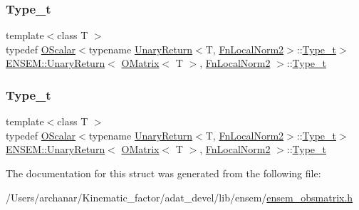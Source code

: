 \subsubsection{\texorpdfstring{Type\_t}{Type\_t}\hspace{0.1cm}{\footnotesize\ttfamily [1/2]}}
{\footnotesize\ttfamily template$<$class T $>$ \\
typedef \mbox{\hyperlink{classENSEM_1_1OScalar}{O\+Scalar}}$<$typename \mbox{\hyperlink{structENSEM_1_1UnaryReturn}{Unary\+Return}}$<$T, \mbox{\hyperlink{structENSEM_1_1FnLocalNorm2}{Fn\+Local\+Norm2}}$>$\+::\mbox{\hyperlink{structENSEM_1_1UnaryReturn_3_01OMatrix_3_01T_01_4_00_01FnLocalNorm2_01_4_a9961e369c46fba05c0388f2ac5bef1ca}{Type\+\_\+t}}$>$ \mbox{\hyperlink{structENSEM_1_1UnaryReturn}{E\+N\+S\+E\+M\+::\+Unary\+Return}}$<$ \mbox{\hyperlink{classENSEM_1_1OMatrix}{O\+Matrix}}$<$ T $>$, \mbox{\hyperlink{structENSEM_1_1FnLocalNorm2}{Fn\+Local\+Norm2}} $>$\+::\mbox{\hyperlink{structENSEM_1_1UnaryReturn_3_01OMatrix_3_01T_01_4_00_01FnLocalNorm2_01_4_a9961e369c46fba05c0388f2ac5bef1ca}{Type\+\_\+t}}}

\mbox{\label{structENSEM_1_1UnaryReturn_3_01OMatrix_3_01T_01_4_00_01FnLocalNorm2_01_4_a9961e369c46fba05c0388f2ac5bef1ca}} 
\subsubsection{\texorpdfstring{Type\_t}{Type\_t}\hspace{0.1cm}{\footnotesize\ttfamily [2/2]}}
{\footnotesize\ttfamily template$<$class T $>$ \\
typedef \mbox{\hyperlink{classENSEM_1_1OScalar}{O\+Scalar}}$<$typename \mbox{\hyperlink{structENSEM_1_1UnaryReturn}{Unary\+Return}}$<$T, \mbox{\hyperlink{structENSEM_1_1FnLocalNorm2}{Fn\+Local\+Norm2}}$>$\+::\mbox{\hyperlink{structENSEM_1_1UnaryReturn_3_01OMatrix_3_01T_01_4_00_01FnLocalNorm2_01_4_a9961e369c46fba05c0388f2ac5bef1ca}{Type\+\_\+t}}$>$ \mbox{\hyperlink{structENSEM_1_1UnaryReturn}{E\+N\+S\+E\+M\+::\+Unary\+Return}}$<$ \mbox{\hyperlink{classENSEM_1_1OMatrix}{O\+Matrix}}$<$ T $>$, \mbox{\hyperlink{structENSEM_1_1FnLocalNorm2}{Fn\+Local\+Norm2}} $>$\+::\mbox{\hyperlink{structENSEM_1_1UnaryReturn_3_01OMatrix_3_01T_01_4_00_01FnLocalNorm2_01_4_a9961e369c46fba05c0388f2ac5bef1ca}{Type\+\_\+t}}}



The documentation for this struct was generated from the following file\+:\begin{DoxyCompactItemize}
\item 
/\+Users/archanar/\+Kinematic\+\_\+factor/adat\+\_\+devel/lib/ensem/\mbox{\hyperlink{lib_2ensem_2ensem__obsmatrix_8h}{ensem\+\_\+obsmatrix.\+h}}\end{DoxyCompactItemize}
